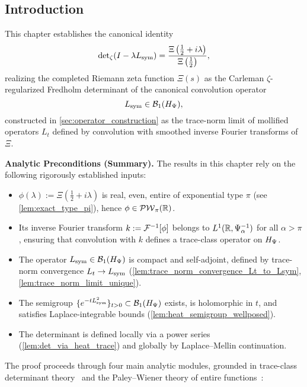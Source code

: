 \subsection*{Introduction}
\label{sec:det_intro}

This chapter establishes the canonical identity
\begin{equation}
\label{eq:zeta_det_identity}
\det\nolimits_{\zeta}(I - \lambda L_{\mathrm{sym}}) 
= \frac{\Xi\left( \tfrac{1}{2} + i\lambda \right)}{\Xi\left( \tfrac{1}{2} \right)},
\end{equation}
realizing the completed Riemann zeta function \( \Xi(s) \) as the Carleman \(\zeta\)-regularized Fredholm determinant of the canonical convolution operator
\[
L_{\mathrm{sym}} \in \mathcal{B}_1(H_{\Psi}),
\]
constructed in \cref{sec:operator_construction} as the trace-norm limit of mollified operators \( L_t \) defined by convolution with smoothed inverse Fourier transforms of \( \Xi \).

\begin{previewbox}
\textbf{Analytic Preconditions (Summary).}
The results in this chapter rely on the following rigorously established inputs:

\begin{itemize}
  \item \( \phi(\lambda) := \Xi(\tfrac{1}{2} + i\lambda) \) is real, even, entire of exponential type \( \pi \) (see \cref{lem:exact_type_pi}), hence \( \phi \in \mathcal{PW}_{\pi}(\mathbb{R}) \).
  \item Its inverse Fourier transform \( k := \mathcal{F}^{-1}[\phi] \) belongs to \( L^1(\mathbb{R}, \Psi_\alpha^{-1}) \) for all \( \alpha > \pi \), ensuring that convolution with \( k \) defines a trace-class operator on \( H_{\Psi} \).
  \item The operator \( L_{\mathrm{sym}} \in \mathcal{B}_1(H_{\Psi}) \) is compact and self-adjoint, defined by trace-norm convergence \( L_t \to L_{\mathrm{sym}} \) (\cref{lem:trace_norm_convergence_Lt_to_Lsym}, \cref{lem:trace_norm_limit_unique}).
  \item The semigroup \( \{ e^{-t L_{\mathrm{sym}}^2} \}_{t > 0} \subset \mathcal{B}_1(H_{\Psi}) \) exists, is holomorphic in \( t \), and satisfies Laplace-integrable bounds (\cref{lem:heat_semigroup_wellposed}).
  \item The determinant is defined locally via a power series (\cref{lem:det_via_heat_trace}) and globally by Laplace–Mellin continuation.
\end{itemize}
\end{previewbox}

\medskip

The proof proceeds through four main analytic modules, grounded in trace-class determinant theory~\cite[Ch.~4]{Simon2005TraceIdeals} and the Paley--Wiener theory of entire functions~\cite[Ch.~9]{Levin1996EntireLectures}:

